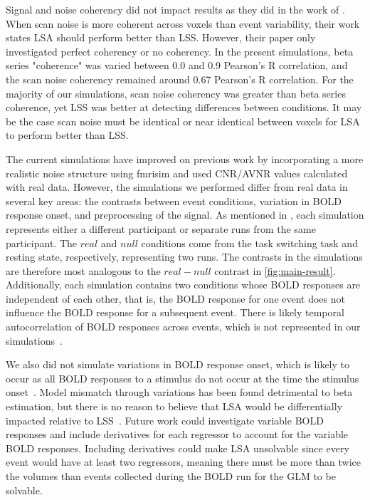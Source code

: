 \documentclass[10pt,letterpaper]{article}
\begin{document}
Signal and noise coherency did not impact results as they did in the work of \cite[Abdulrahman \& Henson (2016)]{Abdulrahman2016}.
When scan noise is more coherent across voxels than event variability,
their work states LSA should perform better than LSS.
However, their paper only investigated perfect coherency or no coherency.
In the present simulations, beta series "coherence" was varied between 0.0 and 0.9 Pearson's R correlation,
and the scan noise coherency remained around 0.67 Pearson's R correlation.
For the majority of our simulations, scan noise coherency was greater than beta series
coherence, yet LSS was better at detecting differences between conditions.
It may be the case scan noise must be identical or near identical between voxels
for LSA to perform better than LSS.

The current simulations have improved on previous work by incorporating a more
realistic noise structure using fmrisim and used CNR/AVNR values calculated with real data.
However, the simulations we performed differ from real data in several key areas: the contrasts between event conditions,
variation in BOLD response onset, and preprocessing of the signal.
As mentioned in , each simulation represents
either a different participant or separate runs from the same participant.
The $real$ and $null$ conditions come from the task switching task and resting state,
respectively, representing two runs.
The contrasts in the simulations are therefore most analogous to the $real - null$
contrast in \ref{fig:main-result}.
Additionally, each simulation contains two conditions whose BOLD responses
are independent of each other, that is, the BOLD response for one event
does not influence the BOLD response for a subsequent event.
There is likely temporal autocorrelation of BOLD responses across events,
which is not represented in our simulations~\cite{Abdulrahman2016}.

We also did not simulate variations in BOLD response onset, which is likely to occur
as all BOLD responses to a stimulus do not occur at the time the stimulus onset~\cite{DEsposito2003}.
Model mismatch through variations has been found detrimental to beta estimation, 
but there is no reason to believe that LSA would be differentially impacted relative to LSS~\cite{Turner2012a}.
Future work could investigate variable BOLD responses and include derivatives for each regressor to account for
the variable BOLD responses.
Including derivatives could make LSA unsolvable since every event would have at least two regressors, meaning
there must be more than twice the volumes than events collected during the BOLD run
for the GLM to be solvable.
\end{document}
